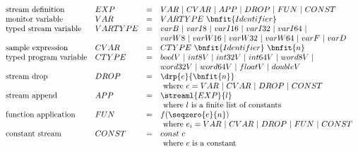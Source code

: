 $$\begin{array}{llcl}
\mbox{stream definition}&EXP &=& VAR \ |\ CVAR \ | \ APP \ | \ DROP \ | \ FUN \ | \ CONST\\
\mbox{monitor variable}& VAR &=& VARTYPE \ \bnfit{Identifier} \\
\mbox{typed stream variable}& VARTYPE &=& varB \ | \ varI8 \ | \ varI16 \ | \ varI32 \ | \ varI64 \ | \\
&&& varW8 \ | \ varW16 \ | \ varW32 \ | \ varW64 \ | \ varF \ | \ varD \\
\mbox{sample expression}& CVAR &=&  CTYPE \ \bnfit{Identifier} \ \bnfit{n}\\
\mbox{typed program variable} &CTYPE &=& boolV \ | \ int8V \ | \ int32V \ | \ int64V \ | \ word8V \ | \\ 
&&& word32V \ | \ word64V \ | \ floatV \ | \ doubleV\\
\mbox{stream drop} &DROP &=& \drp{e}{\bnfit{n}}\\
     &&& \mbox{ where } %
     e = VAR \ | \ CVAR \ | \ DROP \ | \ CONST\\
\mbox{stream append} &APP &=& \streaml{EXP}{l}\\
 &&&\mbox{ where $l$ is a finite list of constants}\\
\mbox{function application} &FUN &=& f(\seqzero{e}{n})\\
        &&& \mbox{ where } e_i = VAR \ | \ CVAR \ | \ DROP \ | \ FUN \ | \ CONST\\
\mbox{constant stream} &CONST &=& const \ c\\
 &&& \mbox{ where $c$ is a constant}
\end{array}$$

